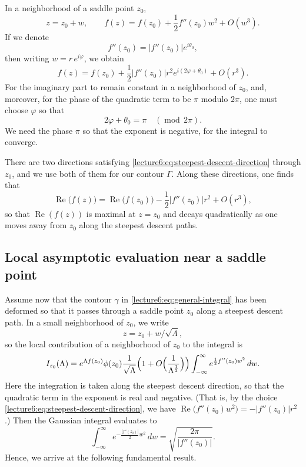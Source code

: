 \documentclass[letterpaper,11pt,oneside,reqno]{book}
\numberwithin{equation}{chapter}  %
\theoremstyle{definition}
\begin{document}
In a neighborhood of a saddle point $z_0$,
\[
	z=z_0+w,
	\qquad
	f(z)=f(z_0)+\frac{1}{2}f''(z_0)w^2 + O(w^3).
\]
If we denote
\[
	f''(z_0)=|f''(z_0)|e^{i\theta_0},
\]
then writing $w=r\,e^{i\varphi}$, we obtain
\[
	f(z)=f(z_0)+\frac{1}{2}|f''(z_0)|r^2e^{i(2\varphi+\theta_0)}+O(r^3).
\]
For the imaginary part to remain constant in a neighborhood
of $z_0$, and, moreover,
for the phase of the quadratic term to be $\pi$ modulo $2\pi$, one must choose $\varphi$ so that
\begin{equation}
	\label{lecture6:eq:steepest-descent-direction}
	2\varphi+\theta_0=\pi \quad (\operatorname{mod}\,2\pi).
\end{equation}
We need the phase $\pi$ so that the exponent is negative, for the integral to converge.

There are two directions satisfying \eqref{lecture6:eq:steepest-descent-direction}
through $z_0$, and we use both of them for our contour $\Gamma$.
Along these directions, one finds that
\[
	\operatorname{Re}\bigl(f(z)\bigr)=\operatorname{Re}\bigl(f(z_0)\bigr)-\frac{1}{2}|f''(z_0)|r^2+O(r^3),
\]
so that $\operatorname{Re}(f(z))$ is maximal at $z=z_0$ and decays quadratically as one moves away from $z_0$ along the steepest descent paths.

\subsection{Local asymptotic evaluation near a saddle point}

Assume now that the contour $\gamma$ in \eqref{lecture6:eq:general-integral} has been deformed so that it passes through a saddle point $z_0$ along a steepest descent path. In a small neighborhood of $z_0$, we write
\[
	z=z_0+w/\sqrt{\Lambda},
\]
so the local contribution of a neighborhood of $z_0$ to the integral is
\begin{equation}
	\label{lecture6:eq:local-contribution}
	I_{z_0}(\Lambda)=e^{\Lambda f(z_0)}\phi(z_0)\frac{1}{\sqrt{\Lambda}}
	\Bigl(1+O\Bigl(\frac{1}{\Lambda^{\frac12}}\Bigr)\Bigr)
	\int_{-\infty}^{\infty} e^{\frac{1}{2}f''(z_0)w^2}\,dw
	.
\end{equation}
Here the integration is taken along the steepest descent direction, so that the quadratic term in the exponent is real and negative. (That is, by the choice \eqref{lecture6:eq:steepest-descent-direction}, we have $\operatorname{Re}\bigl(f''(z_0)w^2\bigr)=-|f''(z_0)|r^2$.) Then the Gaussian integral evaluates to
\[
	\int_{-\infty}^{\infty} e^{-\frac{|f''(z_0)|}{2}w^2}\,dw
	=\sqrt{\frac{2\pi}{|f''(z_0)|}}.
\]
Hence, we
arrive at the following fundamental result.
\end{document}
